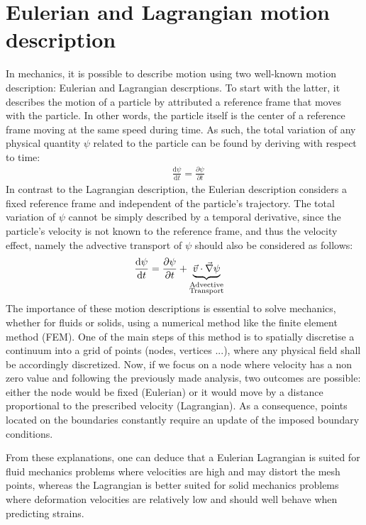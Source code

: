 \section{Eulerian and Lagrangian motion description}
In mechanics, it is possible to describe motion using two well-known motion description: Eulerian and Lagrangian descrptions.
To start with the latter, it describes the motion of a particle by attributed a reference frame that moves with the particle.
In other words, the particle itself is the center of a reference frame moving at the same speed during time. As such, the total variation
of any physical quantity $\psi$ related to the particle can be found by deriving with respect to time:
\begin{align}
\label{eq:lagrangian}
& \frac{\mathrm{d} \psi}{\mathrm{d} t} = \frac{\partial \psi}{\partial t}
\end{align}
In contrast to the Lagrangian description, the Eulerian description considers a 
fixed reference frame and independent of the particle's trajectory. The total variation of $\psi$
cannot be simply described by a temporal derivative, since the particle's velocity is not known to 
the reference frame, and thus the velocity effect, namely the advective transport of $\psi$ should also be considered as follows:
\begin{align}
\label{eq:eulerian}
& \frac{\mathrm{d} \psi}{\mathrm{d} t} = \frac{\partial \psi}{\partial t} + \underbrace{\vec{v} \cdot \vec{\nabla} \psi}_{\substack{\text{Advective} \\ \text{Transport}}}  
\end{align}
The importance of these motion descriptions is essential to solve mechanics, whether for fluids or solids, using a numerical method like the finite 
element method (FEM). One of the main steps of this method is to spatially discretise a continuum into a grid of points (nodes, vertices ...), where any 
physical field shall be accordingly discretized. Now, if we focus on a node where velocity has a non zero value and following the previously made analysis,
two outcomes are possible: either the node would be fixed (Eulerian) or it would move by a distance proportional to the prescribed velocity (Lagrangian).
As a consequence, points located on the boundaries constantly require an update of the imposed boundary conditions.

From these explanations, one can deduce that a Eulerian Lagrangian is suited for fluid mechanics problems where 
velocities are high and may distort the mesh points, whereas the Lagrangian is better suited for solid mechanics 
problems where deformation velocities are relatively low and should well behave when predicting strains.

